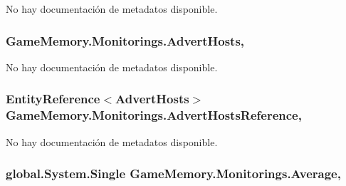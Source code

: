 No hay documentación de metadatos disponible. 

\hypertarget{class_game_memory_1_1_monitorings_a10100dcedb82f94509cc9e9c62c25db5}{
\subsubsection[{Advert\-Hosts}]{ Game\-Memory.\-Monitorings.\-Advert\-Hosts\hspace{0.3cm}{\ttfamily [get]}, {\ttfamily [set]}}}\label{class_game_memory_1_1_monitorings_a10100dcedb82f94509cc9e9c62c25db5}


No hay documentación de metadatos disponible. 

\hypertarget{class_game_memory_1_1_monitorings_aac0e39b01bbc04291109a4d934708151}{
\subsubsection[{Advert\-Hosts\-Reference}]{\setlength{\rightskip}{0pt plus 5cm}Entity\-Reference$<${\bf Advert\-Hosts}$>$ Game\-Memory.\-Monitorings.\-Advert\-Hosts\-Reference\hspace{0.3cm}{\ttfamily [get]}, {\ttfamily [set]}}}\label{class_game_memory_1_1_monitorings_aac0e39b01bbc04291109a4d934708151}


No hay documentación de metadatos disponible. 

\hypertarget{class_game_memory_1_1_monitorings_a7e93e01d5c9831e48213a03aa37ac386}{
\subsubsection[{Average}]{\setlength{\rightskip}{0pt plus 5cm}global.\-System.\-Single Game\-Memory.\-Monitorings.\-Average\hspace{0.3cm}{\ttfamily [get]}, {\ttfamily [set]}}}\label{class_game_memory_1_1_monitorings_a7e93e01d5c9831e48213a03aa37ac386}


